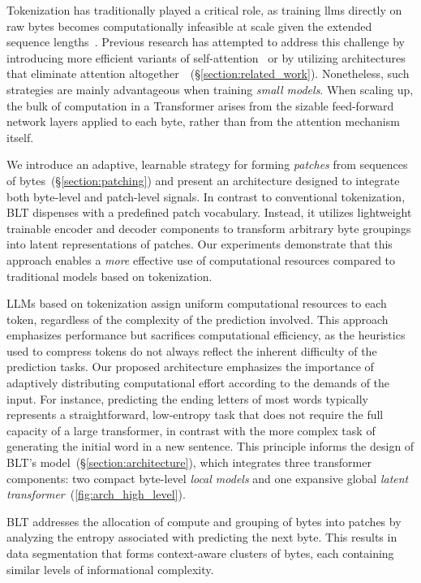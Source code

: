 Tokenization has traditionally played a critical role, as training llms directly on raw bytes becomes computationally infeasible at scale given the extended sequence lengths~\citep{xue2022byt5}. Previous research has attempted to address this challenge by introducing more efficient variants of self-attention~\citep{el2020characterbert, clark2022canine} or by utilizing architectures that eliminate attention altogether~\citep{wang2024mambabyte}~(\S\ref{section:related_work}). Nonetheless, such strategies are mainly advantageous when training \textit{small models}. When scaling up, the bulk of computation in a Transformer arises from the sizable feed-forward network layers applied to each byte, rather than from the attention mechanism itself.

We introduce an adaptive, learnable strategy for forming \textit{patches} from sequences of bytes~(\S\ref{section:patching}) and present an architecture designed to integrate both byte-level and patch-level signals. In contrast to conventional tokenization, {\textsc BLT} dispenses with a predefined patch vocabulary. Instead, it utilizes lightweight trainable encoder and decoder components to transform arbitrary byte groupings into latent representations of patches. Our experiments demonstrate that this approach enables a \textit{more} effective use of computational resources compared to traditional models based on tokenization.

LLMs based on tokenization assign uniform computational resources to each token, regardless of the complexity of the prediction involved. This approach emphasizes performance but sacrifices computational efficiency, as the heuristics used to compress tokens do not always reflect the inherent difficulty of the prediction tasks. Our proposed architecture emphasizes the importance of adaptively distributing computational effort according to the demands of the input. For instance, predicting the ending letters of most words typically represents a straightforward, low-entropy task that does not require the full capacity of a large transformer, in contrast with the more complex task of generating the initial word in a new sentence. This principle informs the design of {\textsc BLT}'s model~(\S\ref{section:architecture}), which integrates three transformer components: two compact byte-level \textit{local models} and one expansive global \textit{latent transformer}~(\autoref{fig:arch_high_level}). 

{\textsc BLT} addresses the allocation of compute and grouping of bytes into patches by analyzing the entropy associated with predicting the next byte. This results in data segmentation that forms context-aware clusters of bytes, each containing similar levels of informational complexity.

